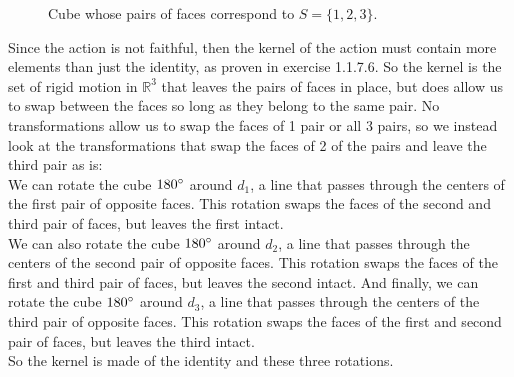 \documentclass{article}
\newcommand{\R}{\mathbb{R}}
\begin{document}
\begin{figure}[H]

        \caption{\label{fig:figure1} Cube whose pairs of faces correspond to
        $S = \{1, 2, 3\}$.}
    \end{figure}

    Since the action is not faithful,
    then the kernel of the action must contain more elements
    than just the identity,
    as proven in exercise 1.1.7.6.
    So the kernel is the set of rigid motion in $\R^3$ that leaves the
    pairs of faces in place,
    but does allow us to swap between the faces so long as they belong
    to the same pair.
    No transformations allow us to swap the faces of 1 pair or all 3 pairs,
    so we instead look at the transformations that swap the faces of 2
    of the pairs and leave the third pair as is: \\
    We can rotate the cube $180 \degree$ around $d_1$,
    a line that passes through the centers of the first pair of opposite
    faces. This rotation swaps the faces of the second and third pair
    of faces, but leaves the first intact. \\
    We can also rotate the cube $180 \degree$ around $d_2$,
    a line that passes through the centers of the second pair of opposite
    faces. This rotation swaps the faces of the first and third pair
    of faces, but leaves the second intact.
    And finally, we can rotate the cube $180 \degree$ around $d_3$,
    a line that passes through the centers of the third pair of opposite
    faces. This rotation swaps the faces of the first and second pair
    of faces, but leaves the third intact. \\
    So the kernel is made of the identity and these three rotations.
\end{document}
